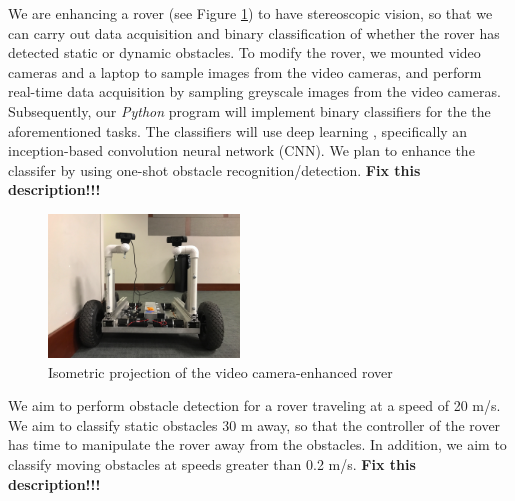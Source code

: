 \documentclass[letter,12pt]{article}
\begin{document}
We are enhancing a rover (see Figure \ref{fig:Isometricprojectionofthevideocameraenhancedrover}) to have stereoscopic vision, so that we can carry out data acquisition and binary classification of whether the rover has detected static or dynamic obstacles. To modify the rover, we mounted video cameras and a laptop to sample images from the video cameras, and perform real-time data acquisition by sampling greyscale images from the video cameras. Subsequently, our {\it Python} program will implement binary classifiers for the the aforementioned tasks. The classifiers will use deep learning \cite{Buduma2017,Ketkar2017,Pattanayak2017,Goodfellow2016,Wang2016,Bengio2015,Cho2014,Goodfellow2014}, specifically an inception-based convolution neural network (CNN). We plan to enhance the classifer by using one-shot obstacle recognition/detection. {\Huge \bf Fix this description!!!}


\begin{figure}[h]
\centering 
\includegraphics[height=1.5in]{./pics/rover}
\caption{Isometric projection of the video camera-enhanced rover}
\label{fig:Isometricprojectionofthevideocameraenhancedrover}
\end{figure}


We aim to perform obstacle detection for a rover traveling at a speed of 20 m/s. We aim to classify static obstacles 30 m away, so that the controller of the rover has time to manipulate the rover away from the obstacles. In addition, we aim to classify moving obstacles at speeds greater than 0.2 m/s. {\Huge \bf Fix this description!!!}
\end{document}
